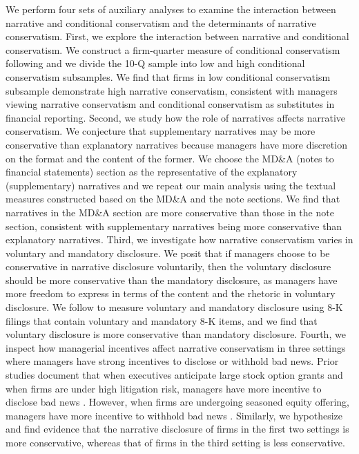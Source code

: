 \documentclass[a4paper]{article}
\begin{document}
\begin{spacing}{2}
We perform four sets of auxiliary analyses to examine the interaction between narrative and conditional conservatism and the determinants of narrative conservatism. First, we explore the interaction between narrative and conditional conservatism. We construct a firm-quarter measure of conditional conservatism following  and we divide the 10-Q sample into low and high conditional conservatism subsamples. We find that firms in low conditional conservatism subsample demonstrate high narrative conservatism, consistent with managers viewing narrative conservatism and conditional conservatism as substitutes in financial reporting. Second, we study how the role of narratives affects narrative conservatism. We conjecture that supplementary narratives may be more conservative than explanatory narratives because managers have more discretion on the format and the content of the former. We choose the MD\&A (notes to financial statements) section as the representative of the explanatory (supplementary) narratives and we repeat our main analysis using the textual measures constructed based on the MD\&A and the note sections. We find that narratives in the MD\&A section are more conservative than those in the note section, consistent with supplementary narratives being more conservative than explanatory narratives. Third, we investigate how narrative conservatism varies in voluntary and mandatory disclosure. We posit that if managers choose to be conservative in narrative disclosure voluntarily, then the voluntary disclosure should be more conservative than the mandatory disclosure, as managers have more freedom to express in terms of the content and the rhetoric in voluntary disclosure. We follow  to measure voluntary and mandatory disclosure using 8-K filings that contain voluntary and mandatory 8-K items, and we find that voluntary disclosure is more conservative than mandatory disclosure. Fourth, we inspect how managerial incentives affect narrative conservatism in three settings where managers have strong incentives to disclose or withhold bad news. Prior studies document that when executives anticipate large stock option grants and when firms are under high litigation risk, managers have more incentive to disclose bad news \cite{aboodyCEOStockOption2000, skinnerWhyFirmsVoluntarily1994, skinnerEarningsDisclosuresStockholder1997}. However, when firms are undergoing seasoned equity offering, managers have more incentive to withhold bad news \cite{teohEarningsManagementUnderperformance1998}. Similarly, we hypothesize and find evidence that the narrative disclosure of firms in the first two settings is more conservative, whereas that of firms in the third setting is less conservative.


\end{spacing}
\end{document}
